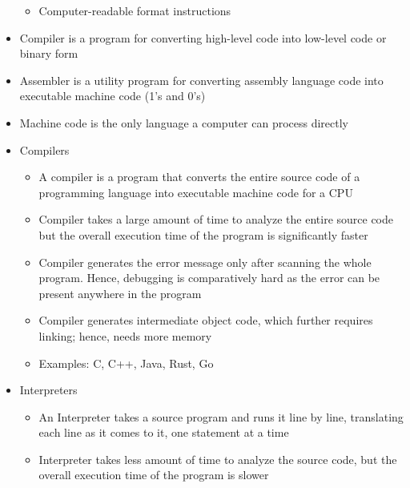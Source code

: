 \begin{itemize}
\begin{itemize}
      \item Computer-readable format instructions

    \end{itemize}

  \item Compiler is a program for converting high-level code into low-level code or binary form

  \item Assembler is a utility program for converting assembly language code into executable machine code (1's and 0's)

  \item Machine code is the only language a computer can process directly

  \item Compilers

      \begin{itemize}

        \item A compiler is a program that converts the entire source code of a programming language into executable machine code for a CPU 

        \item Compiler takes a large amount of time to analyze the entire source code but the overall execution time of the program is significantly faster 

        \item Compiler generates the error message only after scanning the whole program. Hence, debugging is comparatively hard as the error can be present anywhere in the program 

        \item Compiler generates intermediate object code, which further requires linking; hence, needs more memory 

        \item Examples: C, C++, Java, Rust, Go 

    \end{itemize} 

    \item Interpreters

      \begin{itemize}

        \item An Interpreter takes a source program and runs it line by line, translating each line as it comes to it, one statement at a time

        \item Interpreter takes less amount of time to analyze the source code, but the overall execution time of the program is slower


\end{itemize}
\end{itemize}
